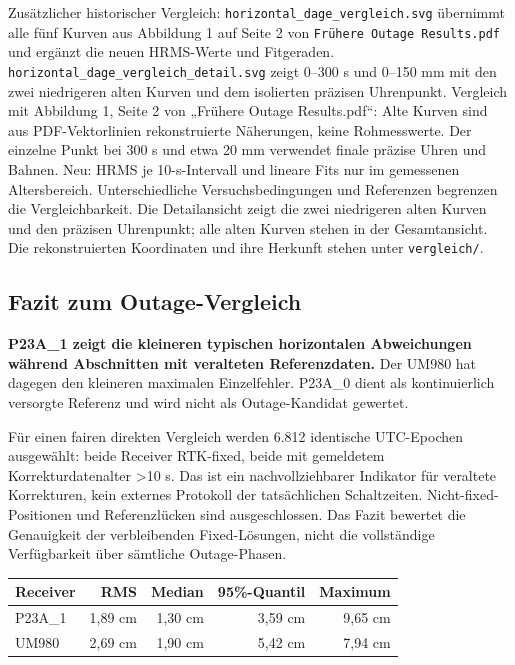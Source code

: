 \documentclass[11pt,a4paper]{article}
\begin{document}
Zusätzlicher historischer Vergleich: {\small\texttt{horizontal\_\allowbreak{}dage\_\allowbreak{}vergleich.svg}} übernimmt alle fünf Kurven aus Abbildung 1 auf Seite 2 von {\small\texttt{Frühere Outage Results.pdf}} und ergänzt die neuen HRMS-Werte und Fitgeraden. {\small\texttt{horizontal\_\allowbreak{}dage\_\allowbreak{}vergleich\_\allowbreak{}detail.svg}} zeigt 0–300 s und 0–150 mm mit den zwei niedrigeren alten Kurven und dem isolierten präzisen Uhrenpunkt. Vergleich mit Abbildung 1, Seite 2 von „Frühere Outage Results.pdf“: Alte Kurven sind aus PDF-Vektorlinien rekonstruierte Näherungen, keine Rohmesswerte. Der einzelne Punkt bei 300 s und etwa 20 mm verwendet finale präzise Uhren und Bahnen. Neu: HRMS je 10-s-Intervall und lineare Fits nur im gemessenen Altersbereich. Unterschiedliche Versuchsbedingungen und Referenzen begrenzen die Vergleichbarkeit. Die Detailansicht zeigt die zwei niedrigeren alten Kurven und den präzisen Uhrenpunkt; alle alten Kurven stehen in der Gesamtansicht. Die rekonstruierten Koordinaten und ihre Herkunft stehen unter {\small\texttt{vergleich/\allowbreak{}}}.

\subsection{Fazit zum Outage-Vergleich}

\textbf{P23A\_1 zeigt die kleineren typischen horizontalen Abweichungen während Abschnitten mit veralteten Referenzdaten.} Der UM980 hat dagegen den kleineren maximalen Einzelfehler. P23A\_0 dient als kontinuierlich versorgte Referenz und wird nicht als Outage-Kandidat gewertet.

Für einen fairen direkten Vergleich werden 6.812 identische UTC-Epochen ausgewählt: beide Receiver RTK-fixed, beide mit gemeldetem Korrekturdatenalter >10 s. Das ist ein nachvollziehbarer Indikator für veraltete Korrekturen, kein externes Protokoll der tatsächlichen Schaltzeiten. Nicht-fixed-Positionen und Referenzlücken sind ausgeschlossen. Das Fazit bewertet die Genauigkeit der verbleibenden Fixed-Lösungen, nicht die vollständige Verfügbarkeit über sämtliche Outage-Phasen.

\begin{center}\small\begin{tabular}{lrrrr}\toprule
Receiver & RMS & Median & 95\%-Quantil & Maximum\\\midrule
P23A\_1 & 1,89 cm & 1,30 cm & 3,59 cm & 9,65 cm\\
UM980 & 2,69 cm & 1,90 cm & 5,42 cm & 7,94 cm\\
\bottomrule\end{tabular}\end{center}
\end{document}
